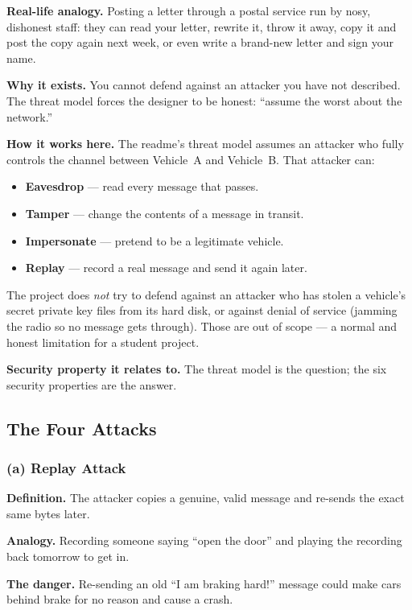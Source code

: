 \documentclass[11pt,a4paper]{article}
\begin{document}
\textbf{Real-life analogy.} Posting a letter through a postal service run by
nosy, dishonest staff: they can read your letter, rewrite it, throw it away,
copy it and post the copy again next week, or even write a brand-new letter and
sign your name.

\textbf{Why it exists.} You cannot defend against an attacker you have not
described. The threat model forces the designer to be honest: ``assume the worst
about the network.''

\textbf{How it works here.} The readme's threat model assumes an attacker who
fully controls the channel between Vehicle~A and Vehicle~B. That attacker can:
\begin{itemize}
  \item \textbf{Eavesdrop} --- read every message that passes.
  \item \textbf{Tamper} --- change the contents of a message in transit.
  \item \textbf{Impersonate} --- pretend to be a legitimate vehicle.
  \item \textbf{Replay} --- record a real message and send it again later.
\end{itemize}
The project does \emph{not} try to defend against an attacker who has stolen a
vehicle's secret private key files from its hard disk, or against denial of
service (jamming the radio so no message gets through). Those are out of scope
--- a normal and honest limitation for a student project.

\textbf{Security property it relates to.} The threat model is the question;
the six security properties are the answer.

\subsection{The Four Attacks}

\subsubsection*{(a) Replay Attack}
\textbf{Definition.} The attacker copies a genuine, valid message and re-sends
the exact same bytes later.

\textbf{Analogy.} Recording someone saying ``open the door'' and playing the
recording back tomorrow to get in.

\textbf{The danger.} Re-sending an old ``I am braking hard!'' message could make
cars behind brake for no reason and cause a crash.
\end{document}
